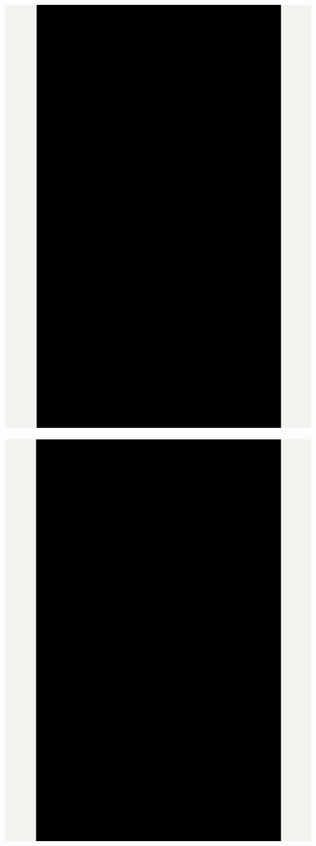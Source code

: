 \Continuing
\begin{center}
    \includegraphics[width=36em]{ide-linkedin-p2_public}
\end{center}
\WillContinue
\pagebreak

\Continuing
\begin{center}
    \includegraphics[width=36em]{ide-linkedin-p3_public}
\end{center}

\pagebreak
